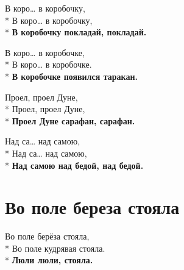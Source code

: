 \medskip

\begin{minipage}{\linewidth}
В коро… в коробочку,\\*
В коро… в коробочку,\\*
\textbf{В коробочку покладай, покладай.}\\
\end{minipage}\par\medskip\nobreak

\medskip

\begin{minipage}{\linewidth}
В коро… в коробочке,\\*
В коро… в коробочке.\\*
\textbf{В коробочке появился таракан.}\\
\end{minipage}\par\medskip\nobreak

\medskip

\begin{minipage}{\linewidth}
Проел, проел Дуне,\\*
Проел, проел Дуне,\\*
\textbf{Проел Дуне сарафан, сарафан.}\\
\end{minipage}\par\medskip\nobreak

\medskip

\begin{minipage}{\linewidth}
Над са… над самою,\\*
Над са… над самою,\\*
\textbf{Над самою над бедой, над бедой.}\\
\end{minipage}

\vspace{\fill}\newpage

\section{Во поле береза стояла}
\label{song:Во_поле_береза_стояла}

\medskip

\begin{minipage}{\linewidth}
Во поле берёза стояла,\\*
Во поле кудрявая стояла.\\*
\textbf{Люли люли, стояла.}\\
\end{minipage}\par\medskip\nobreak

